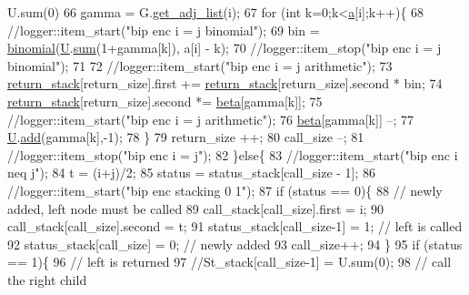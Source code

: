 \begin{DoxyCode}
{       U.sum(0)}
66       gamma = G.\hyperlink{classb__graph_aa81c7179b9c6cb4986c4b41e84a85799}{get\_adj\_list}(i);
67       \textcolor{keywordflow}{for} (\textcolor{keywordtype}{int} k=0;k<\hyperlink{classb__graph__encoder_afd22d167f495cd85b41397f337c377c2}{a}[i];k++)\{
68         \textcolor{comment}{//logger::item\_start("bip enc i = j binomial");}
69         bin = \hyperlink{compression__helper_8cpp_acecca9cb279d3b3d82915a07d67818cf}{binomial}(\hyperlink{classb__graph__encoder_ac810138443002a2b2cf579ced2dc34ce}{U}.\hyperlink{classreverse__fenwick__tree_a672731fd6395b4853430073a099a80e6}{sum}(1+gamma[k]), a[i] - k);
70         \textcolor{comment}{//logger::item\_stop("bip enc i = j binomial");}
71 
72         \textcolor{comment}{//logger::item\_start("bip enc i = j arithmetic");}
73         \hyperlink{namespacehelper__vars_a6d2100c373830cacd232319a9958652d}{return\_stack}[return\_size].first += \hyperlink{namespacehelper__vars_a6d2100c373830cacd232319a9958652d}{return\_stack}[return\_size].second * bin;
74         \hyperlink{namespacehelper__vars_a6d2100c373830cacd232319a9958652d}{return\_stack}[return\_size].second *= \hyperlink{classb__graph__encoder_ae54d76cc4cee399d98951f870897a144}{beta}[gamma[k]];
75         \textcolor{comment}{//logger::item\_start("bip enc i = j arithmetic");}
76         \hyperlink{classb__graph__encoder_ae54d76cc4cee399d98951f870897a144}{beta}[gamma[k]] --;
77         \hyperlink{classb__graph__encoder_ac810138443002a2b2cf579ced2dc34ce}{U}.\hyperlink{classreverse__fenwick__tree_a942d7f49b37e53ebfec3076d177691d7}{add}(gamma[k],-1);
78       \}
79       return\_size ++;
80       call\_size --;
81       \textcolor{comment}{//logger::item\_stop("bip enc i = j");}
82     \}\textcolor{keywordflow}{else}\{
83       \textcolor{comment}{//logger::item\_start("bip enc i neq j");}
84       t = (i+j)/2;
85       status = status\_stack[call\_size - 1];
86       \textcolor{comment}{//logger::item\_start("bip enc stacking 0 1");}
87       \textcolor{keywordflow}{if} (status == 0)\{
88         \textcolor{comment}{// newly added, left node must be called}
89         call\_stack[call\_size].first = i;
90         call\_stack[call\_size].second = t;
91         status\_stack[call\_size-1] = 1; \textcolor{comment}{// left is called}
92         status\_stack[call\_size] = 0; \textcolor{comment}{// newly added}
93         call\_size++;
94       \}
95       \textcolor{keywordflow}{if} (status == 1)\{
96         \textcolor{comment}{// left is returned}
97         \textcolor{comment}{//St\_stack[call\_size-1] = U.sum(0);}
98         \textcolor{comment}{// call the right child}

\end{DoxyCode}
